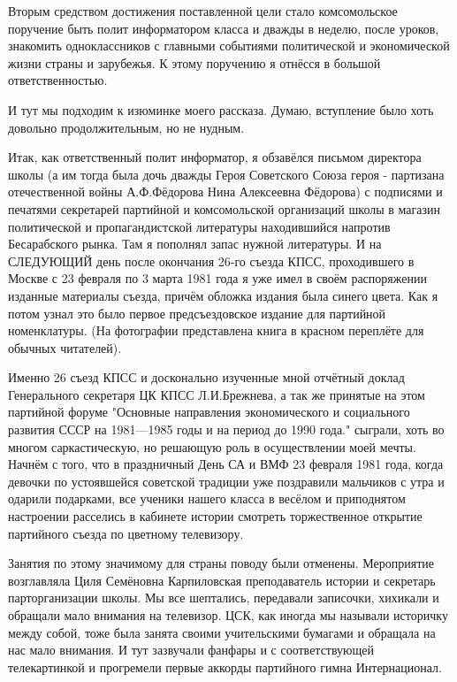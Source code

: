 Вторым средством достижения поставленной цели стало комсомольское поручение
быть полит информатором класса и дважды в неделю, после уроков, знакомить
одноклассников с главными событиями политической и экономической жизни страны и
зарубежья. К этому поручению я отнёсся в большой ответственностью. 

И тут мы подходим к изюминке моего рассказа. Думаю, вступление было хоть
довольно продолжительным, но не нудным.

Итак, как ответственный полит информатор, я обзавёлся письмом директора школы
(а им тогда была дочь дважды Героя Советского Союза героя - партизана
отечественной войны А.Ф.Фёдорова Нина Алексеевна Фёдорова) с подписями и
печатями секретарей партийной и комсомольской организаций школы в магазин
политической и пропагандистской литературы находившийся напротив Бесарабского
рынка. Там я пополнял запас нужной литературы. И на СЛЕДУЮЩИЙ день после
окончания 26-го съезда КПСС, проходившего в Москве с 23 февраля по 3 марта
1981 года я уже имел в своём распоряжении изданные материалы съезда, причём
обложка издания была синего цвета. Как я потом узнал это было первое
предсъездовское издание для партийной номенклатуры. (На фотографии
представлена книга в красном переплёте для обычных читателей). 

Именно 26
съезд КПСС и досконально изученные мной отчётный доклад Генерального
секретаря ЦК КПСС Л.И.Брежнева, а так же принятые на этом партийной форуме
"Основные направления экономического и социального развития СССР на 1981—1985
годы и на период до 1990 года." сыграли, хоть во многом саркастическую, но
решающую роль в осуществлении моей мечты. Начнём с того, что в праздничный
День СА и ВМФ 23 февраля 1981 года, когда девочки по устоявшейся советской
традиции уже поздравили мальчиков с утра и одарили подарками, все ученики
нашего класса в весёлом и приподнятом настроении расселись в кабинете истории
смотреть торжественное открытие партийного съезда по цветному телевизору.

Занятия по этому значимому для страны поводу были отменены. Мероприятие
возглавляла Циля Семёновна Карпиловская преподаватель истории и секретарь
парторганизации школы. Мы все шептались, передавали записочки, хихикали и
обращали мало внимания на телевизор. ЦСК, как иногда мы называли историчку
между собой, тоже была занята своими учительскими бумагами и обращала на нас
мало внимания. И тут зазвучали фанфары и с соответствующей телекартинкой и
прогремели первые аккорды партийного гимна Интернационал. 

